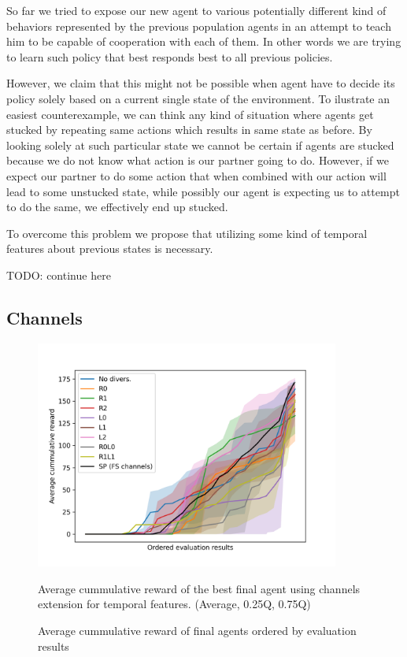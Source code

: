 So far we tried to expose our new agent to various potentially different kind of behaviors represented by the previous population agents in an attempt to teach him to be capable of cooperation with each of them.
In other words we are trying to learn such policy that best responds best to all previous policies.

However, we claim that this might not be possible when agent have to decide its policy solely based on a current single state of the environment.
To ilustrate an easiest counterexample, we can think any kind of situation where agents get stucked by repeating same actions which results in same state as before.
By looking solely at such particular state we cannot be certain if agents are stucked because we do not know what action is our partner going to do.
However, if we expect our partner to do some action that when combined with our action will lead to some unstucked state, while possibly our agent is expecting us to attempt to do the same, we effectively end up stucked.

To overcome this problem we propose that utilizing some kind of temporal features about previous states is necessary.

TODO: continue here










\subsection{Channels}

\begin{figure}[!ht]
    \centering
    \includegraphics*[width=10cm]{../img/FSChannelsOrderedAvg.png}

    \caption{Average cummulative reward of final agents ordered by evaluation results}
    \label{FSChannelsOrderedAvg}
    \medskip
    \small 
    Average cummulative reward of the best final agent using channels extension for temporal features.    
    (Average, 0.25Q, 0.75Q)

\end{figure}

